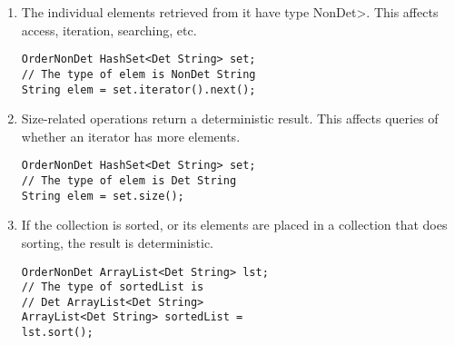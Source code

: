 \begin{enumerate}
    \item
    The individual elements retrieved from it have type \<NonDet>.  This
    affects access, iteration, searching, etc.
    \begin{verbatim}
OrderNonDet HashSet<Det String> set; 
// The type of elem is NonDet String
String elem = set.iterator().next();
    \end{verbatim}
    \vspace{-0.4cm}
    \item
    Size-related operations return a deterministic result.  This affects
    queries of whether an iterator has more elements.
    \begin{verbatim}
OrderNonDet HashSet<Det String> set; 
// The type of elem is Det String
String elem = set.size();
    \end{verbatim}
    \vspace{-0.4cm}
    \item
    If the collection is sorted, or its elements are placed in a collection
    that does sorting, the result is deterministic.
    \begin{verbatim}
OrderNonDet ArrayList<Det String> lst; 
// The type of sortedList is 
// Det ArrayList<Det String>
ArrayList<Det String> sortedList = 
lst.sort();
    \end{verbatim}
    \vspace{-0.4cm}
\end{enumerate}

